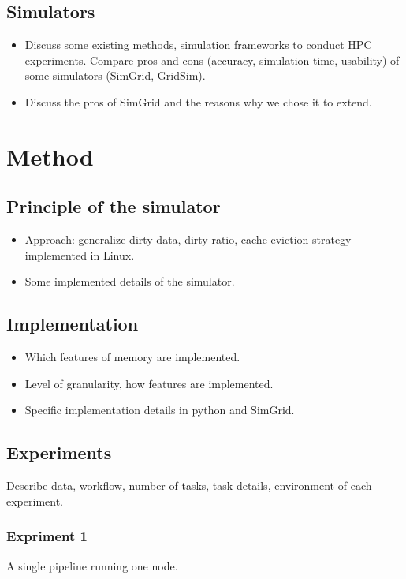 \documentclass[conference]{IEEEtran}
\begin{document}
		\subsection{Simulators}
			\begin{itemize}
				\item Discuss some existing methods, simulation frameworks to conduct HPC experiments. Compare pros and cons (accuracy, simulation time, usability) of some simulators (SimGrid, GridSim).
				\item Discuss the pros of SimGrid and the reasons why we chose it to extend.
			\end{itemize}
			
	\section{Method}

		\subsection{Principle of the simulator}

			\begin{itemize}
				\item Approach: generalize dirty data, dirty ratio, cache eviction strategy implemented in Linux. 
				\item Some implemented details of the simulator.
			\end{itemize}

		\subsection{Implementation}
			\begin{itemize}
				\item Which features of memory are implemented.
				\item Level of granularity, how features are implemented.
				\item Specific implementation details in python and SimGrid.
			\end{itemize}

		\subsection{Experiments}
			Describe data, workflow, number of tasks, task details, environment of each experiment.
	
			\subsubsection{Expriment 1}
				A single pipeline running one node.
\end{document}
